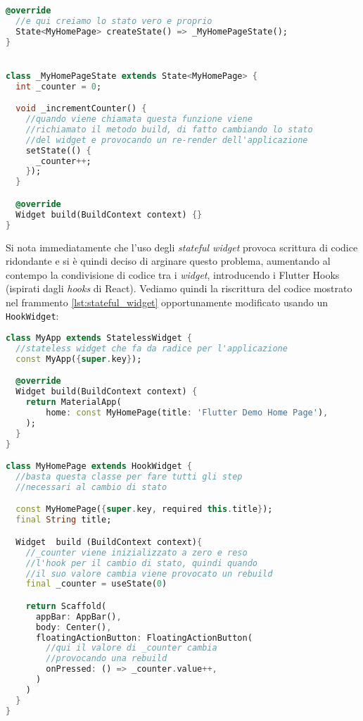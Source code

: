 \begin{appendices}
\begin{lstlisting}[language=dart, label={lst:stateful_widget}, caption={Creazione \textit{stateless widget}}]
  @override
  //e qui creiamo lo stato vero e proprio
  State<MyHomePage> createState() => _MyHomePageState();
}


class _MyHomePageState extends State<MyHomePage> {
  int _counter = 0;

  void _incrementCounter() {
    //quando viene chiamata questa funzione viene
    //richiamato il metodo build, di fatto cambiando lo stato 
    //del widget e provocando un re-render dell'applicazione
    setState(() {
      _counter++;
    });
  }

  @override
  Widget build(BuildContext context) {}
}
\end{lstlisting}

Si nota immediatamente che l'uso degli \textit{stateful widget} provoca scrittura di codice ridondante e si è quindi deciso di arginare questo problema, aumentando al contempo la condivisione di codice tra i \textit{widget}, introducendo i Flutter Hooks (ispirati dagli \textit{hooks} di React).
Vediamo quindi la riscrittura del codice mostrato nel frammento \ref{lst:stateful_widget} opportunamente modificato usando un \verb+HookWidget+:

\begin{lstlisting}[language=dart, caption={Creazione \textit{hook widget}}]
class MyApp extends StatelessWidget {
  //stateless widget che fa da radice per l'applicazione
  const MyApp({super.key});

  @override
  Widget build(BuildContext context) {
    return MaterialApp(
        home: const MyHomePage(title: 'Flutter Demo Home Page'),
    );
  }
}

class MyHomePage extends HookWidget {
  //basta questa classe per fare tutti gli step
  //necessari al cambio di stato

  const MyHomePage({super.key, required this.title});
  final String title;

  Widget  build (BuildContext context){
    //_counter viene inizializzato a zero e reso
    //l'hook per il cambio di stato, quindi quando
    //il suo valore cambia viene provocato un rebuild
    final _counter = useState(0)

    return Scaffold(
      appBar: AppBar(),
      body: Center(),
      floatingActionButton: FloatingActionButton(
        //qui il valore di _counter cambia
        //provocando una rebuild
        onPressed: () => _counter.value++,
      )
    )
  }
}
\end{lstlisting}


\end{appendices}
